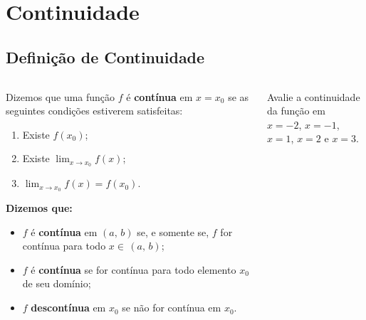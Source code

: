\section{Continuidade}

\subsection{Definição de Continuidade}
\begin{frame}
  \begin{columns}[onlytextwidth]
    \begin{column}{0.49\textwidth}\vspace{-0.5cm}
      \begin{definition}[Continuidade]
        Dizemos que uma função $f$ é \textbf{contínua} em $x=x_{0}$ se as seguintes condições estiverem satisfeitas:
        \begin{enumerate}
          \item Existe $f(x_{0})$;
          \item Existe $\displaystyle\lim_{x\to x_{0}}{f(x)}$;
          \item $\displaystyle\lim_{x\to x_{0}}{f(x)}=f(x_{0})$.
        \end{enumerate}
      \end{definition}
      \begin{highlight}
        \textbf{Dizemos que:}
        \begin{itemize}\small
          \item $f$ é \textbf{contínua} em $(a,\,b)$ se, e somente se, $f$ for contínua para todo $x\in\,(a,\,b)$;
          \item $f$ é \textbf{contínua} se for contínua para todo elemento $x_{0}$ de seu domínio;
          \item $f$ \textbf{descontínua} em $x_{0}$ se não for contínua em $x_{0}$. \vspace*{-3pt}
        \end{itemize}
      \end{highlight}
    \end{column}
    \begin{column}{0.49\textwidth}\vspace{-0.5cm}
      \begin{example-highlight}
        Avalie a continuidade da função em \\$x=-2$, $x=-1$, $x=1$, $x=2$ e $x=3$.
      \end{example-highlight}
      \begin{figure}\vspace*{-0.5cm}
      \end{figure}
    \end{column}
  \end{columns}
\end{frame}


